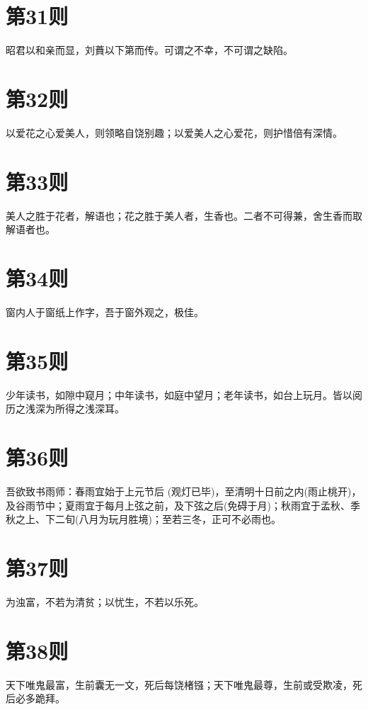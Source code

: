 \documentclass[12pt,a4paper]{ctexbook}
\begin{document}
\section{第31则}
昭君以和亲而显，刘蕡以下第而传。可谓之不幸，不可谓之缺陷。\par

\section{第32则}
以爱花之心爱美人，则领略自饶别趣；以爱美人之心爱花，则护惜倍有深情。\par

\section{第33则}
美人之胜于花者，解语也；花之胜于美人者，生香也。二者不可得兼，舍生香而取解语者也。\par

\section{第34则}
窗内人于窗纸上作字，吾于窗外观之，极佳。\par

\section{第35则}
少年读书，如隙中窥月；中年读书，如庭中望月；老年读书，如台上玩月。皆以阅历之浅深为所得之浅深耳。\par

\section{第36则}
吾欲致书雨师：春雨宜始于上元节后 (观灯已毕)，至清明十日前之内(雨止桃开)，及谷雨节中；夏雨宜于每月上弦之前，及下弦之后(免碍于月)；秋雨宜于孟秋、季秋之上、下二旬(八月为玩月胜境)；至若三冬，正可不必雨也。\par

\section{第37则}
为浊富，不若为清贫；以忧生，不若以乐死。\par

\section{第38则}
天下唯鬼最富，生前囊无一文，死后每饶楮镪；天下唯鬼最尊，生前或受欺凌，死后必多跪拜。\par
\end{document}
